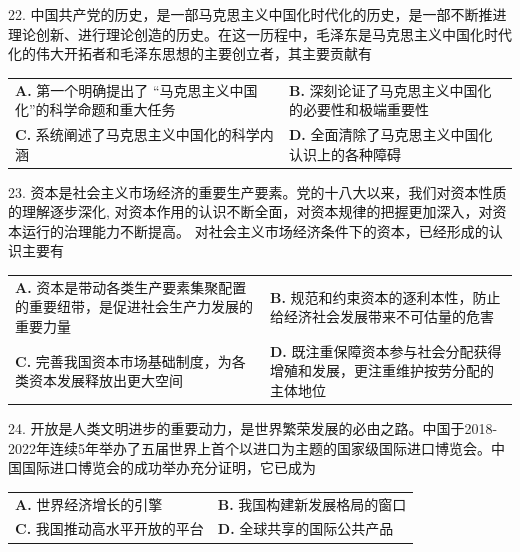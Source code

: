 \documentclass[UTF8,11pt]{ctexart}
\begin{document}
22. 中国共产党的历史，是一部马克思主义中国化时代化的历史，是一部不断推进理论创新、进行理论创造的历史。在这一历程中，毛泽东是马克思主义中国化时代化的伟大开拓者和毛泽东思想的主要创立者，其主要贡献有


\begin{center}\begin{tabular}{>{\raggedright\arraybackslash}p{\dimexpr(\linewidth-4\tabcolsep)/2\relax}>{\raggedright\arraybackslash}p{\dimexpr(\linewidth-4\tabcolsep)/2\relax}}
\textbf{A.} 第一个明确提出了 “马克思主义中国化”的科学命题和重大任务 & \textbf{B.} 深刻论证了马克思主义中国化的必要性和极端重要性\\[.35em]
\textbf{C.} 系统阐述了马克思主义中国化的科学内涵 & \textbf{D.} 全面清除了马克思主义中国化认识上的各种障碍\\[.35em]\end{tabular}\end{center}

23. 资本是社会主义市场经济的重要生产要素。党的十八大以来，我们对资本性质的理解逐步深化, 对资本作用的认识不断全面，对资本规律的把握更加深入，对资本运行的治理能力不断提高。 对社会主义市场经济条件下的资本，已经形成的认识主要有


\begin{center}\begin{tabular}{>{\raggedright\arraybackslash}p{\dimexpr(\linewidth-4\tabcolsep)/2\relax}>{\raggedright\arraybackslash}p{\dimexpr(\linewidth-4\tabcolsep)/2\relax}}
\textbf{A.} 资本是带动各类生产要素集聚配置的重要纽带，是促进社会生产力发展的重要力量 & \textbf{B.} 规范和约束资本的逐利本性，防止给经济社会发展带来不可估量的危害\\[.35em]
\textbf{C.} 完善我国资本市场基础制度，为各类资本发展释放出更大空间 & \textbf{D.} 既注重保障资本参与社会分配获得增殖和发展，更注重维护按劳分配的主体地位\\[.35em]\end{tabular}\end{center}

24. 开放是人类文明进步的重要动力，是世界繁荣发展的必由之路。中国于2018-2022年连续5年举办了五届世界上首个以进口为主题的国家级国际进口博览会。中国国际进口博览会的成功举办充分证明，它已成为


\begin{center}\begin{tabular}{>{\raggedright\arraybackslash}p{\dimexpr(\linewidth-4\tabcolsep)/2\relax}>{\raggedright\arraybackslash}p{\dimexpr(\linewidth-4\tabcolsep)/2\relax}}
\textbf{A.} 世界经济增长的引擎 & \textbf{B.} 我国构建新发展格局的窗口\\[.35em]
\textbf{C.} 我国推动高水平开放的平台 & \textbf{D.} 全球共享的国际公共产品\\[.35em]\end{tabular}\end{center}
\end{document}
